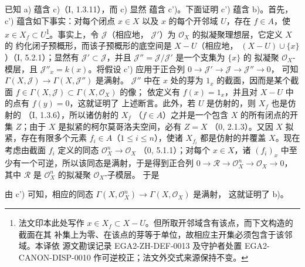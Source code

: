\documentclass[UTF8,fontset=none,11pt,oneside,openany]{ctexbook}
\newcommand{\oldpage}[2][]{%
  \hypertarget{ega-source-page-#1-#2}{}%
  \marginnote{\scriptsize\textbf{#1}~|~#2}\ignorespaces}
\newcommand{\egaxref}[2]{\textup{#2}}
\begin{document}
已知 a) 蕴含 c)（\egaxref{I.1.3.11-zh}{I, 1.3.11}），而 c) 显然
蕴含 c')。下面证明 c') 蕴含 b)。首先，c') 蕴含如下事实：对每个闭点
$x\in X$ 以及 $x$ 的每个开邻域 $U$，存在 $f\in A$，使
$x\in X_f\subset U$\footnote{法文印本此处写作
$x\in X_f\subset X-U$。但所取开邻域含有该点，而下文构造的截面在其
补集上为零、在该点的芽等于单位，故相应主开集必须包含于该邻域。本译依
源文勘误记录 EGA2-ZH-DEF-0013 及守护者处置
EGA2-CANON-DISP-0010 作可逆校正；法文外交式来源保持不变。}。事实上，令 $\mathcal{J}$（相应地，
$\mathcal{J}'$）为 $\mathcal{O}_X$ 的拟凝聚理想层，它定义 $X$ 的
约化闭子预概形，而该子预概形的底空间是 $X-U$（相应地，
$(X-U)\cup\{x\}$）（\egaxref{I.5.2.1-zh}{I, 5.2.1}）；显然有
$\mathcal{J}'\subset\mathcal{J}$，并且
$\mathcal{J}''=\mathcal{J}/\mathcal{J}'$ 是一个支集为 $\{x\}$ 的
拟凝聚 $\mathcal{O}_X$-模层，且 $\mathcal{J}''_x=k(x)$。将假设 c')
应用于正合列 $0\to\mathcal{J}'\to\mathcal{J}\to\mathcal{J}''\to0$，
可知 $\Gamma(X,\mathcal{J})\to\Gamma(X,\mathcal{J}'')$ 是满射。
$\mathcal{J}''$ 中在 $x$ 处的芽为 $1_x$ 的截面，因而是某个截面
$f\in\Gamma(X,\mathcal{J})\subset\Gamma(X,\mathcal{O}_X)$ 的像；
依定义有 $f(x)=1_x$，并且对 $X-U$ 中的点有 $f(y)=0$，这就证明了
上述断言。此外，若 $U$ 是仿射的，则 $X_f$ 也是仿射的
（\egaxref{I.1.3.6-zh}{I, 1.3.6}），所以诸仿射的 $X_f$
（$f\in A$）之并是一个包含 $X$ 的所有闭点的开集 $Z$；由于 $X$
是拟紧的柯尔莫哥洛夫空间，必有 $Z=X$
（\egaxref{0.2.1.3-zh}{0, 2.1.3}）。又因 $X$ 拟紧，存在有限多个元素
$f_i\in A$（$1\leq i\leq n$），使诸 $X_{f_i}$ 都是仿射的并覆盖
$X$。现在考虑由截面 $f_i$ 定义的同态
$\mathcal{O}_X^n\to\mathcal{O}_X$
（\egaxref{0.5.1.1-zh}{0, 5.1.1}）；对每个 $x\in X$，诸
$(f_i)_x$ 中至少有一个可逆，所以该同态是满射，于是得到正合列
$0\to\mathcal{R}\to\mathcal{O}_X^n\to\mathcal{O}_X\to0$，其中
$\mathcal{R}$ 是 $\mathcal{O}_X^n$ 的拟凝聚 $\mathcal{O}_X$-子模层。
于是

\oldpage[II]{98}

由 c') 可知，相应的同态
$\Gamma(X,\mathcal{O}_X^n)\to\Gamma(X,\mathcal{O}_X)$ 是满射，
这就证明了 b)。
\end{document}
